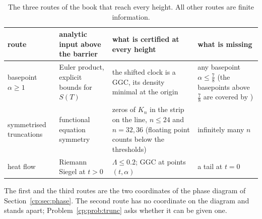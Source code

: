 \begin{table}[ht]
\centering\footnotesize
\begin{tabular}{@{}p{}p{}p{}p{}@{}}
\toprule
route & analytic input above the barrier & what is certified at every height & what is missing\\
\midrule
\raggedright basepoint $\alpha\ge1$ & \raggedright Euler product, explicit bounds for $S(T)$ & \raggedright the shifted clock is a GGC, its density minimal at the origin & any basepoint $\alpha\le\frac78$ (the basepoints above $\frac78$ are covered by \cite{OAI26a})\\
\raggedright symmetrised truncations & \raggedright functional equation symmetry & \raggedright zeros of $K_n$ in the strip on the line, $n\le24$ and $n=32,36$ (floating point counts below the thresholds) & infinitely many $n$\\
\raggedright heat flow & \raggedright Riemann Siegel at $t>0$ & \raggedright $\Lambda\le0.2$; GGC at points $(t,\alpha)$ & a tail at $t=0$\\
\bottomrule
\end{tabular}
\caption{The three routes of the book that reach every height. All other routes are finite information.}
\label{cp:tab:three}
\end{table}

The first and the third routes are the two coordinates of the phase diagram of Section~\ref{cp:sec:phase}. The second route has no coordinate on the diagram and stands apart; Problem~\ref{cp:prob:trunc} asks whether it can be given one.
